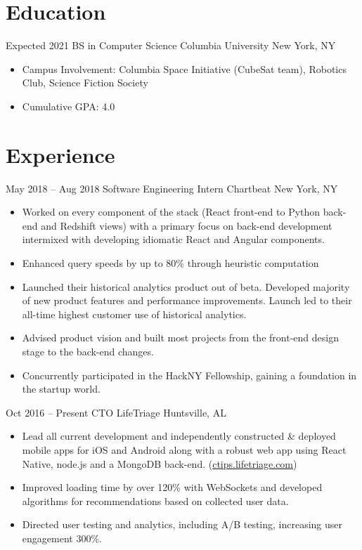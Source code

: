 \documentclass[letterpaper]{moderncv}        %
\begin{document}
\makecvtitle
\section{Education}
\cventry
{Expected 2021}
{BS in Computer Science}
{Columbia University}
{New York, NY}
{}
{\begin{itemize}%
	\item Campus Involvement: Columbia Space Initiative (CubeSat team), Robotics Club, Science Fiction Society
         \item Cumulative GPA: 4.0
	\end{itemize}}
\section{Experience}
\cventry
{May 2018 -- Aug 2018}
{Software Engineering Intern}
{Chartbeat}
{New York, NY}
{}
{\begin{itemize}%
	\item Worked on every component of the stack (React front-end to Python back-end and Redshift views) with a primary focus on back-end development intermixed with developing idiomatic React and Angular components.
	\item Enhanced query speeds by up to 80\% through heuristic computation
	\item Launched their historical analytics product out of beta. Developed majority of new product features and performance improvements. Launch led to their all-time highest  customer use of historical analytics.
	\item Advised product vision and built most projects from the front-end design stage to the back-end changes.
	\item Concurrently participated in the HackNY Fellowship, gaining a foundation in the startup world.
	\end{itemize}}
\cventry
{Oct 2016 -- Present}
{CTO}
{LifeTriage}
{Huntsville, AL}
{}
{\begin{itemize}%
	\item Lead all current development and independently constructed \& deployed mobile apps for iOS and Android along with a robust web app using React Native, node.js and a MongoDB back-end. (\href{https://ctips.lifetriage.com}{ctips.lifetriage.com})
	\item Improved loading time by over 120\% with WebSockets and developed algorithms for recommendations based on collected user data.
	\item Directed user testing and analytics, including A/B testing, increasing user engagement 300\%.
	\end{itemize}}
\end{document}
